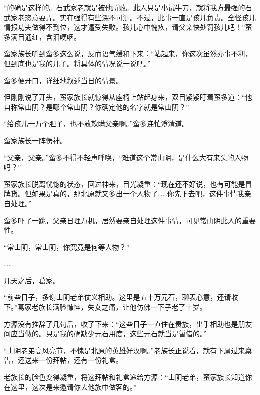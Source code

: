 \begin{this_body}
“的确是这样的。石武家老就是被他所败。此人只是小试牛刀，就将我方最强的石武家老恣意耍弄。实在强得有些深不可测。不过，此事一直是孩儿负责。全怪孩儿情报功夫做得不到位，这才遭受失败。孩儿心中愧疚，请父亲快处罚孩儿吧！”蛮多满目通红，含泪哽咽。

蛮家族长听到蛮多这么说，反而语气缓和下来：“站起来，你这次虽然办事不利，但到底也是我的儿子。将具体的情况说一说吧。”

蛮多便开口，详细地叙述当日的情景。

但刚刚说了开头，蛮家族长就惊得从座椅上站起身来，双目紧紧盯着蛮多道：“他自称常山阴？是哪个常山阴？你确定他的名字就是常山阴？”

“给孩儿一万个胆子，也不敢欺瞒父亲啊。”蛮多连忙澄清道。

蛮家族长一阵愣神。

“父亲，父亲。”蛮多不得不轻声呼唤，“难道这个常山阴，是什么大有来头的人物吗？”

蛮家族长脱离恍惚的状态，回过神来，目光凝重：“现在还不好说，也有可能是冒牌货。但如果是真的，那北原就又多出一个人物了……你先下去吧，这件事情我亲自处理。”

蛮多吓了一跳，父亲日理万机，居然要亲自处理这件事情，可见常山阴此人的重要性。

“常山阴，常山阴，你究竟是何等人物？”

……

几天之后，葛家。

“前些日子，多谢山阴老弟仗义相助。这里是五十万元石，聊表心意，还请收下。”葛家老族长满脸憔悴，失女之痛，让他仿佛一下子老了十岁。

方源没有推辞了几句后，收了下来：“这些日子一直住在贵族，出手相助也是朋友间应当做的。只是我的确缺少元石用度，这些元石就当是暂借的。”

“山阴老弟高风亮节，不愧是北原的英雄好汉啊。”老族长正说着，就有下属过来禀告，还送来一份拜帖，还有一份礼盒。

老族长的脸色变得凝重，将这拜帖和礼盒递给方源：“山阴老弟，蛮家族长知道你在这里，这次是来邀请你去他族中做客的。”

\end{this_body}

